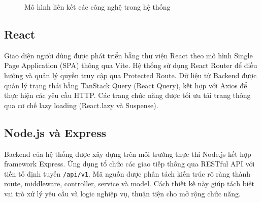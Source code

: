 \documentclass[12pt, a4paper]{report}
\begin{document}
\begin{figure}[htbp]
{
    }
    \caption{Mô hình liên kết các công nghệ trong hệ thống}
    \label{fig:cac_cong_nghe}
\end{figure}

\subsection{React}
Giao diện người dùng được phát triển bằng thư viện React theo mô hình Single Page Application (SPA) thông qua Vite. Hệ thống sử dụng React Router để điều hướng và quản lý quyền truy cập qua Protected Route. Dữ liệu từ Backend được quản lý trạng thái bằng TanStack Query (React Query), kết hợp với Axios để thực hiện các yêu cầu HTTP. Các trang chức năng được tối ưu tải trang thông qua cơ chế lazy loading (React.lazy và Suspense).

\subsection{Node.js và Express}
Backend của hệ thống được xây dựng trên môi trường thực thi Node.js kết hợp framework Express. Ứng dụng tổ chức các giao tiếp thông qua RESTful API với tiền tố định tuyến \texttt{/api/v1}. Mã nguồn được phân tách kiến trúc rõ ràng thành route, middleware, controller, service và model. Cách thiết kế này giúp tách biệt vai trò xử lý yêu cầu và logic nghiệp vụ, thuận tiện cho mở rộng chức năng.
\end{document}
